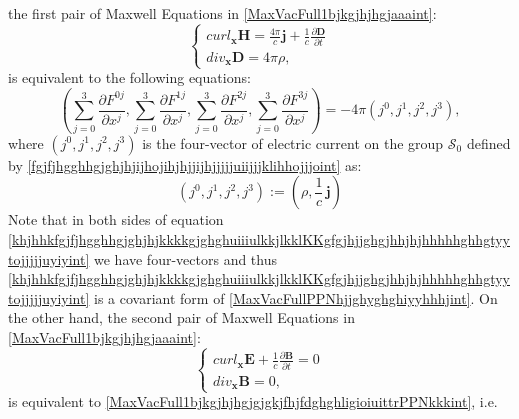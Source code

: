 \documentclass{article}
\theoremstyle{definition}
\theoremstyle{remark}
\renewcommand{\vec}[1]{\mathbf{#1}}
\newcommand{\er}{\eqref}
\newcommand{\er}{\eqref}
\begin{document}
the first pair of Maxwell Equations in
\er{MaxVacFull1bjkgjhjhgjaaaint}:
\begin{equation}\label{MaxVacFullPPNhjjghyghghiyyhhhjint}
\begin{cases}
curl_{\vec x} \vec H=\frac{4\pi}{c}\vec j+\frac{1}{c}\frac{\partial \vec D}{\partial t}\\
div_{\vec x} \vec D= 4\pi\rho,
\end{cases}
\end{equation}
is equivalent to the following equations:
\begin{equation}\label{khjhhkfgjfjhgghhgjghjhjkkkkgjghghuiiiulkkjlkklKKgfgjhjjghgjhhjhjhhhhhghhgtyytojjjjjuyiyint}
\left(\sum_{j=0}^{3}\frac{\partial F^{0j}}{\partial
x^j},\sum_{j=0}^{3}\frac{\partial F^{1j}}{\partial
x^j},\sum_{j=0}^{3}\frac{\partial F^{2j}}{\partial
x^j},\sum_{j=0}^{3}\frac{\partial F^{3j}}{\partial x^j}\right)
=-4\pi(j^0,j^1,j^2,j^3),
\end{equation}
where $(j^0,j^1,j^2,j^3)$ is the four-vector of electric current on
the group $\mathcal{S}_0$ defined by
\er{fgjfjhgghhgjghjhjijhojihjhjjijhjjjjjuiijjjklihhojjjoint} as:
\begin{equation}
\label{fgjfjhgghhgjghjhjijhojihjhjjijhjjjjjuiijjjklihhojjjoouuoiuiuint}
(j^0,j^1,j^2,j^3):=\left(\rho,\frac{1}{c}\,\vec j\right)
\end{equation}
Note that in both sides of equation
\er{khjhhkfgjfjhgghhgjghjhjkkkkgjghghuiiiulkkjlkklKKgfgjhjjghgjhhjhjhhhhhghhgtyytojjjjjuyiyint}
we have four-vectors and thus
\er{khjhhkfgjfjhgghhgjghjhjkkkkgjghghuiiiulkkjlkklKKgfgjhjjghgjhhjhjhhhhhghhgtyytojjjjjuyiyint}
is a covariant form of \er{MaxVacFullPPNhjjghyghghiyyhhhjint}. On
the other hand, the second pair of Maxwell Equations in
\er{MaxVacFull1bjkgjhjhgjaaaint}:
\begin{equation}\label{MaxVacFullPPNhjjghyghghiyyint}
\begin{cases}
curl_{\vec x} \vec E+\frac{1}{c}\frac{\partial \vec B}{\partial t}=0\\
div_{\vec x} \vec B=0,
\end{cases}
\end{equation}
is equivalent to
\er{MaxVacFull1bjkgjhjhgjgjgkjfhjfdghghligioiuittrPPNkkkint}, i.e.
\end{document}
